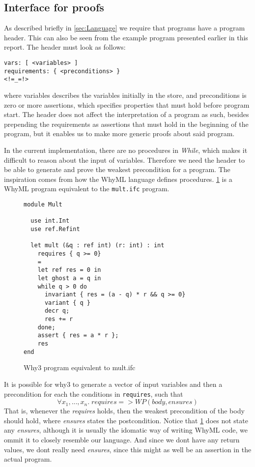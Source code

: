 \subsection{Interface for proofs}\label{sec:interface}
As described briefly in \cref{sec:Language} we require that programs have a program header.
This can also be seen from the example program presented earlier in this report.
The header must look as follows:
\begin{lstlisting}
vars: [ <variables> ]
requirements: { <preconditions> }
<!=_=!>
\end{lstlisting}
where \<variables\> describes the variables initially in the store, and \<preconditions\> is zero or more assertions, which specifies properties that must hold before program start.
The header does not affect the interpretation of a program as such, besides prepending the requirements as assertions that must hold in the beginning of the program, but it enables us to make more generic proofs about said program.

In the current implementation, there are no procedures in \textit{While}, which makes it difficult to reason about the input of variables.
Therefore we need the header to be able to generate and prove the weakest precondition for a program.
The inspiration comes from how the WhyML language defines procedures.
\cref{fig:why3} is a WhyML program equivalent to the \texttt{mult.ifc} program.

\begin{figure}[h]
\begin{lstlisting}
module Mult

  use int.Int
  use ref.Refint

  let mult (&q : ref int) (r: int) : int
    requires { q >= 0}
    =
    let ref res = 0 in
    let ghost a = q in
    while q > 0 do
      invariant { res = (a - q) * r && q >= 0}
      variant { q }
      decr q;
      res += r
    done;
    assert { res = a * r };
    res
end
\end{lstlisting}
\caption{Why3 program equivalent to mult.ifc}
\label{fig:why3}
\end{figure}

It is possible for why3 to generate a vector of input variables and then a precondition for each the conditions in \texttt{requires}, such that 
$$\forall x_{1},...,x_{n}. \; requires => WP(body, ensures)$$
That is, whenever the \textit{requires} holds, then the weakest precondition of the body should hold, where \textit{ensures} states the postcondition.
Notice that \cref{fig:why3} does not state any \textit{ensures}, although it is usually the idomatic way of writing WhyML code, we ommit it to closely resemble our language.
And since we dont have any return values, we dont really need \textit{ensures}, since this might as well be an assertion in the actual program.
